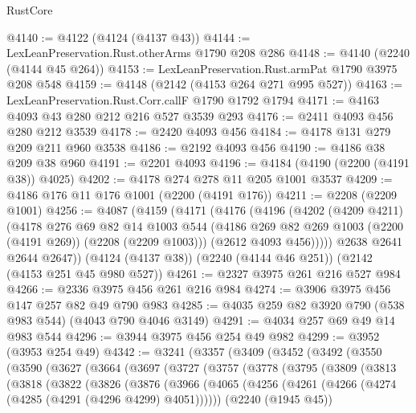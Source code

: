 \begin{lexlean}{RustCore}
\begin{coremodule}
@4140 := @4122 (@4124 (@4137 @43))
@4144 := LexLeanPreservation.Rust.otherArms @1790 @208 @286
@4148 := @4140 (@2240 (@4144 @45 @264))
@4153 := LexLeanPreservation.Rust.armPat @1790 @3975 @208 @548
@4159 := @4148 (@2142 (@4153 @264 @271 @995 @527))
@4163 := LexLeanPreservation.Rust.Corr.callF @1790 @1792 @1794
@4171 := @4163 @4093 @43 @280 @212 @216 @527 @3539 @293
@4176 := @2411 @4093 @456 @280 @212 @3539
@4178 := @2420 @4093 @456
@4184 := @4178 @131 @279 @209 @211 @960 @3538
@4186 := @2192 @4093 @456
@4190 := @4186 @38 @209 @38 @960
@4191 := @2201 @4093
@4196 := @4184 (@4190 (@2200 (@4191 @38)) @4025)
@4202 := @4178 @274 @278 @11 @205 @1001 @3537
@4209 := @4186 @176 @11 @176 @1001 (@2200 (@4191 @176))
@4211 := @2208 (@2209 @1001)
@4256 := @4087
    (@4159
      (@4171
        (@4176
          (@4196
            (@4202
              (@4209 @4211)
              (@4178
                @276
                @69
                @82
                @14
                @1003
                @544
                (@4186 @269 @82 @269 @1003 (@2200 (@4191 @269)) (@2208 (@2209 @1003)))
                (@2612 @4093 @456)))))
        @2638
        @2641
        @2644
        @2647))
    (@4124 (@4137 @38))
    (@2240 (@4144 @46 @251))
    (@2142 (@4153 @251 @45 @980 @527))
@4261 := @2327 @3975 @261 @216 @527 @984
@4266 := @2336 @3975 @456 @261 @216 @984
@4274 := @3906 @3975 @456 @147 @257 @82 @49 @790 @983
@4285 := @4035 @259 @82 @3920 @790 (@538 @983 @544) (@4043 @790 @4046 @3149)
@4291 := @4034 @257 @69 @49 @14 @983 @544
@4296 := @3944 @3975 @456 @254 @49 @982
@4299 := @3952 (@3953 @254 @49)
@4342 := @3241
    (@3357
      (@3409
        (@3452
          (@3492
            (@3550
              (@3590
                (@3627
                  (@3664
                    (@3697
                      (@3727
                        (@3757
                          (@3778
                            (@3795
                              (@3809
                                (@3813
                                  (@3818
                                    (@3822
                                      (@3826
                                        (@3876
                                          (@3966
                                            (@4065
                                              (@4256
                                                (@4261
                                                  (@4266
                                                    (@4274 (@4285 (@4291 (@4296 @4299) @4051))))))
                                              (@2240 (@1945 @45))

\end{coremodule}
\end{lexlean}
